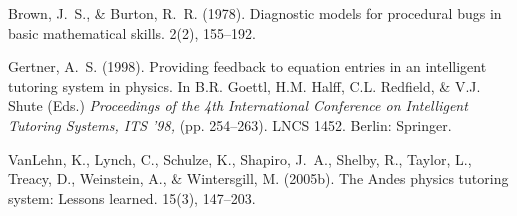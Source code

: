 \documentclass[dvips,11pt,twoside]{article}
\begin{document}
\setlength{\bibhang}{0.75cm}
\begin{small}
\begin{thebibliography}{}\itemsep=0pt
  
Brown, J.~S., \& Burton, R.~R. (1978).
\newblock Diagnostic models for procedural bugs in basic mathematical skills.
 {2(2)}, 155--192.

Gertner, A.~S. (1998).
\newblock Providing feedback to equation entries in an intelligent tutoring
  system in physics.
\newblock In B.R. Goettl, H.M. Halff, C.L. Redfield, \& V.J. Shute (Eds.)
{\em Proceedings of the 4th International Conference on Intelligent Tutoring Systems, ITS
  '98,} (pp. 254--263). LNCS 1452. Berlin: Springer.

VanLehn, K., Lynch, C., Schulze, K., Shapiro, J.~A., Shelby, R., Taylor, L.,
  Treacy, D., Weinstein, A., \& Wintersgill, M. (2005b).
\newblock The Andes physics tutoring system: Lessons learned.
 {15(3)}, 147--203.
\end{thebibliography}
\end{small}
\end{document}
